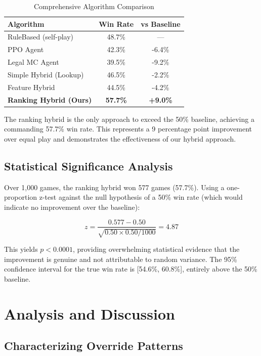 \documentclass[conference]{IEEEtran}
\begin{document}
\begin{table}[htbp]
\caption{Comprehensive Algorithm Comparison}
\begin{center}
\begin{tabular}{lcc}
\toprule
\textbf{Algorithm} & \textbf{Win Rate} & \textbf{vs Baseline} \\
\midrule
RuleBased (self-play) & 48.7\% & — \\
PPO Agent & 42.3\% & -6.4\% \\
Legal MC Agent & 39.5\% & -9.2\% \\
Simple Hybrid (Lookup) & 46.5\% & -2.2\% \\
Feature Hybrid & 44.5\% & -4.2\% \\
\textbf{Ranking Hybrid (Ours)} & \textbf{57.7\%} & \textbf{+9.0\%} \\
\bottomrule
\end{tabular}
\label{tab:comparison}
\end{center}
\end{table}

The ranking hybrid is the only approach to exceed the 50\% baseline, achieving a commanding 57.7\% win rate. This represents a 9 percentage point improvement over equal play and demonstrates the effectiveness of our hybrid approach.

\subsection{Statistical Significance Analysis}

Over 1,000 games, the ranking hybrid won 577 games (57.7\%). Using a one-proportion z-test against the null hypothesis of a 50\% win rate (which would indicate no improvement over the baseline):

\begin{equation}
z = \frac{0.577 - 0.50}{\sqrt{0.50 \times 0.50 / 1000}} = 4.87
\end{equation}

This yields $p < 0.0001$, providing overwhelming statistical evidence that the improvement is genuine and not attributable to random variance. The 95\% confidence interval for the true win rate is [54.6\%, 60.8\%], entirely above the 50\% baseline.

\section{Analysis and Discussion}

\subsection{Characterizing Override Patterns}
\end{document}
